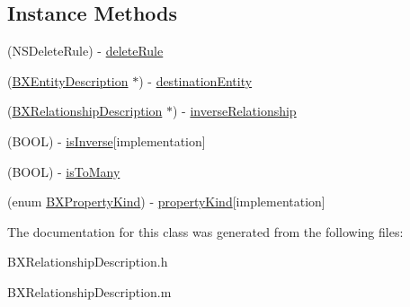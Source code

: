 \subsection*{Instance Methods}
\begin{DoxyCompactItemize}
\item 
\hypertarget{interface_b_x_relationship_description_aa550f316833c243c312171e5bb3e09ae}{}(N\+S\+Delete\+Rule) -\/ \hyperlink{interface_b_x_relationship_description_aa550f316833c243c312171e5bb3e09ae}{delete\+Rule}\label{interface_b_x_relationship_description_aa550f316833c243c312171e5bb3e09ae}

\item 
\hypertarget{interface_b_x_relationship_description_a01bbbe7495b6354fb02c79a85991bf10}{}(\hyperlink{interface_b_x_entity_description}{B\+X\+Entity\+Description} $\ast$) -\/ \hyperlink{interface_b_x_relationship_description_a01bbbe7495b6354fb02c79a85991bf10}{destination\+Entity}\label{interface_b_x_relationship_description_a01bbbe7495b6354fb02c79a85991bf10}

\item 
\hypertarget{interface_b_x_relationship_description_ae42b74c3cd6d89f2bdb3bc3a3e9e61a5}{}(\hyperlink{interface_b_x_relationship_description}{B\+X\+Relationship\+Description} $\ast$) -\/ \hyperlink{interface_b_x_relationship_description_ae42b74c3cd6d89f2bdb3bc3a3e9e61a5}{inverse\+Relationship}\label{interface_b_x_relationship_description_ae42b74c3cd6d89f2bdb3bc3a3e9e61a5}

\item 
\hypertarget{interface_b_x_relationship_description_aa506337af8cf3c7ae4f96945ec88c4df}{}(B\+O\+O\+L) -\/ \hyperlink{interface_b_x_relationship_description_aa506337af8cf3c7ae4f96945ec88c4df}{is\+Inverse}{\ttfamily  \mbox{[}implementation\mbox{]}}\label{interface_b_x_relationship_description_aa506337af8cf3c7ae4f96945ec88c4df}

\item 
\hypertarget{interface_b_x_relationship_description_a271bbcb3550988be4b73f0d4c719283c}{}(B\+O\+O\+L) -\/ \hyperlink{interface_b_x_relationship_description_a271bbcb3550988be4b73f0d4c719283c}{is\+To\+Many}\label{interface_b_x_relationship_description_a271bbcb3550988be4b73f0d4c719283c}

\item 
\hypertarget{interface_b_x_relationship_description_a4860a25e2d8036052e04f031776d075c}{}(enum \hyperlink{_b_x_constants_8h_a4640a84a78f6764e1f92041225c8e81e}{B\+X\+Property\+Kind}) -\/ \hyperlink{interface_b_x_relationship_description_a4860a25e2d8036052e04f031776d075c}{property\+Kind}{\ttfamily  \mbox{[}implementation\mbox{]}}\label{interface_b_x_relationship_description_a4860a25e2d8036052e04f031776d075c}

\end{DoxyCompactItemize}


The documentation for this class was generated from the following files\+:\begin{DoxyCompactItemize}
\item 
B\+X\+Relationship\+Description.\+h\item 
B\+X\+Relationship\+Description.\+m\end{DoxyCompactItemize}
